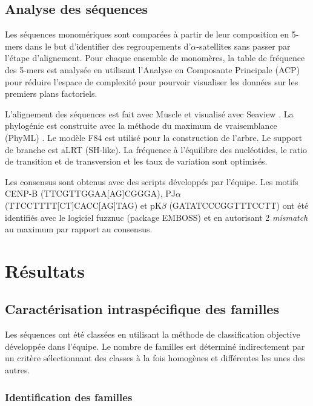 \documentclass[12pt,a4paper]{article}
\begin{document}
	\subsection{Analyse des séquences}
	
Les séquences monomériques sont comparées à partir de leur composition en 5-mers dans le but d'identifier des regroupements d'$\alpha$-satellites sans passer par l'étape d'alignement. Pour chaque ensemble de monomères,	la table de fréquence des 5-mers est analysée en utilisant l'Analyse en Composante Principale (ACP) pour réduire l'espace de complexité pour pourvoir visualiser les données sur les premiers plans factoriels.
	
L'alignement des séquences est fait avec Muscle \cite{Edgar2004} et visualisé avec Seaview \cite{Galtier1996}. La phylogénie est construite avec la méthode du maximum de vraisemblance (PhyML) \cite{Guindon2009}. Le modèle F84 est utilisé pour la construction de l'arbre. Le support de branche est aLRT (SH-like). La fréquence à l'équilibre des nucléotides, le ratio de transition et de transversion et les taux de variation sont optimisés.

Les consensus sont obtenus avec des scripts développés par l'équipe. Les motifs CENP-B (TTCGTTGGAA[AG]CGGGA), PJ$\alpha$ (TTCCTTTT[CT]CACC[AG]TAG) et pK$\beta$ (GATATCCCGGTTTCCTT) ont été identifiés avec le logiciel fuzznuc (package EMBOSS) \cite{Rice2000} et en autorisant 2 \textit{mismatch} au maximum par rapport au consensus.

\section{Résultats}
	\subsection{Caractérisation intraspécifique des familles}
	Les séquences ont été classées en utilisant la méthode de classification objective développée dans l'équipe. Le nombre de familles est déterminé indirectement par un critère sélectionnant des classes à la fois homogènes et différentes les unes des autres.
	
			\subsubsection{Identification des familles}
			
\end{document}

